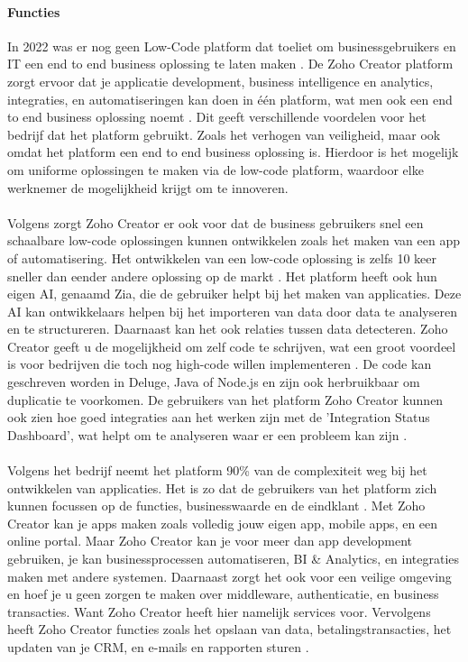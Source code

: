 \paragraph{Functies}
In 2022 was er nog geen Low-Code platform dat toeliet om businessgebruikers en IT een end to end business oplossing te laten maken \autocite{Computer2022}.
De Zoho Creator platform zorgt ervoor dat je applicatie development, business intelligence en analytics, integraties, en automatiseringen kan doen in één platform, wat men ook een end to end business oplossing noemt \autocite{Computer2022}.
Dit geeft verschillende voordelen voor het bedrijf dat het platform gebruikt. Zoals het verhogen van veiligheid, maar ook omdat het platform een end to end business oplossing is. Hierdoor is het mogelijk om uniforme oplossingen te maken via de low-code platform,
waardoor elke werknemer de mogelijkheid krijgt om te innoveren.\\\\ Volgens \textcite{Computer2022} zorgt Zoho Creator er ook voor dat de business gebruikers snel een schaalbare low-code oplossingen kunnen ontwikkelen zoals het maken van een app of automatisering.
Het ontwikkelen van een low-code oplossing is zelfs 10 keer sneller dan eender andere oplossing op de markt \autocite{Computer2022}. Het platform heeft ook hun eigen AI, genaamd Zia, die de gebruiker helpt bij het maken van applicaties. Deze AI
kan ontwikkelaars helpen bij het importeren van data door data te analyseren en te structureren. Daarnaast kan het ook relaties tussen data detecteren. 
Zoho Creator geeft u de mogelijkheid om zelf code te schrijven, wat een groot voordeel is voor bedrijven die toch nog high-code willen implementeren \autocite{Computer2022}. 
De code kan geschreven worden in Deluge, Java of Node.js en zijn ook herbruikbaar om duplicatie te voorkomen.
De gebruikers van het platform Zoho Creator kunnen ook zien hoe goed integraties aan het werken zijn met de 'Integration Status Dashboard', wat helpt om te analyseren waar er een probleem kan zijn \autocite{Computer2022}.
\\ 
\\
Volgens het bedrijf \textcite{ZohoCorporation2024b} neemt het platform 90\% van de complexiteit weg bij het ontwikkelen van applicaties. Het is zo dat de gebruikers van het platform
zich kunnen focussen op de functies, businesswaarde en de eindklant \autocite{ZohoCorporation2024b}.  Met Zoho Creator kan je apps maken zoals volledig jouw eigen app, mobile apps, en een online portal.
Maar Zoho Creator kan je voor meer dan app development gebruiken, je kan businessprocessen automatiseren, BI \& Analytics, en integraties maken met andere systemen. Daarnaast zorgt het ook voor een veilige omgeving en hoef je u geen zorgen 
te maken over middleware, authenticatie, en business transacties. Want Zoho Creator heeft hier namelijk services voor. Vervolgens heeft Zoho Creator functies zoals het opslaan van data,
betalingstransacties, het updaten van je CRM, en e-mails en rapporten sturen \autocite{ZohoCorporation2024b}.

